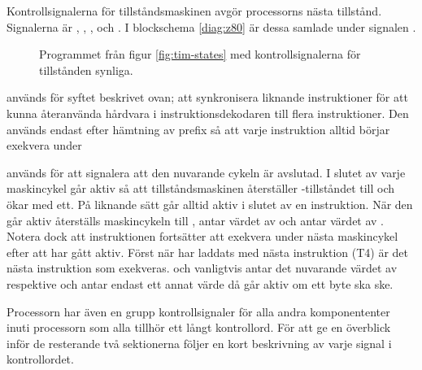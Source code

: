 \documentclass[main.tex]{subfiles}
\begin{document}
Kontrollsignalerna för tillståndsmaskinen avgör processorns nästa tillstånd.
Signalerna är , , ,
 och . I blockschema \ref{diag:z80} är dessa
samlade under signalen .

\begin{SCfigure}
    \centering
    
    \caption{Programmet från figur \ref{fig:tim-states} med kontrollsignalerna
    för tillstånden synliga.}
    \label{fig:tim-statectrl}
\end{SCfigure}

 används för syftet beskrivet ovan; att synkronisera liknande
instruktioner för att kunna återanvända hårdvara i instruktionsdekodaren till
flera instruktioner. Den används endast efter hämtning av prefix så att varje
instruktion alltid börjar exekvera under 

 används för att signalera att den nuvarande cykeln är
avslutad. I slutet av varje maskincykel går  aktiv så att
tillståndsmaskinen återställer -tillståndet till  och ökar
 med ett. På liknande sätt går  alltid aktiv i slutet
av en instruktion. När den går aktiv återställs maskincykeln till ,
 antar värdet av  och  antar värdet av
. Notera dock att instruktionen fortsätter att exekvera under
nästa maskincykel efter att  har gått aktiv. Först när
 har laddats med nästa instruktion (T4) är det nästa instruktion som
exekveras.  och  vanligtvis antar det nuvarande
värdet av  respektive  och antar endast ett annat värde då
 går aktiv om ett byte ska ske.

Processorn har även en grupp kontrollsignaler för alla andra komponententer
inuti processorn som alla tillhör ett långt kontrollord. För att ge en
överblick inför de resterande två sektionerna följer en kort beskrivning av
varje signal i kontrollordet.
\end{document}
